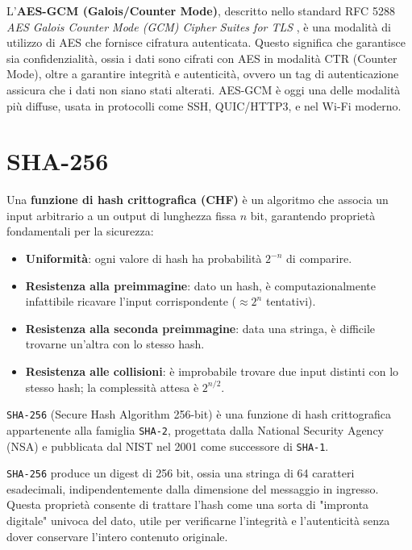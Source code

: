 L’\textbf{AES-GCM (Galois/Counter Mode)}, descritto nello standard RFC 5288 \textit{AES Galois Counter Mode
(GCM) Cipher Suites for TLS} \cite{rfc5288}, è una modalità di utilizzo di AES che fornisce cifratura autenticata.
Questo significa che garantisce sia confidenzialità, ossia i dati sono cifrati con AES in modalità CTR (Counter Mode), oltre a garantire integrità e autenticità, ovvero un tag di autenticazione assicura che i dati non siano stati alterati.
AES-GCM è oggi una delle modalità più diffuse, usata in protocolli come SSH, QUIC/HTTP3, e nel Wi-Fi moderno.

\section{SHA-256}\label{sec:sha}

Una \textbf{funzione di hash crittografica (CHF)} è un algoritmo che associa un input arbitrario a un output di lunghezza fissa $n$ bit, garantendo proprietà fondamentali per la sicurezza:

\begin{itemize}
    \item \textbf{Uniformità}: ogni valore di hash ha probabilità $2^{-n}$ di comparire.
    \item \textbf{Resistenza alla preimmagine}: dato un hash, è computazionalmente infattibile ricavare l'input corrispondente ($\approx 2^n$ tentativi).
    \item \textbf{Resistenza alla seconda preimmagine}: data una stringa, è difficile trovarne un'altra con lo stesso hash.
    \item \textbf{Resistenza alle collisioni}: è improbabile trovare due input distinti con lo stesso hash; la complessità attesa è $2^{n/2}$.
\end{itemize}

\texttt{SHA-256} (Secure Hash Algorithm 256-bit) \cite{FIPS180-4} è una funzione di hash crittografica appartenente alla famiglia \texttt{SHA-2}, progettata dalla National Security Agency (NSA) e pubblicata dal NIST nel 2001 come successore di \texttt{SHA-1}.

\texttt{SHA-256} produce un digest di 256 bit, ossia una stringa di 64 caratteri esadecimali, indipendentemente dalla dimensione del messaggio in ingresso. Questa proprietà consente di trattare l'hash come una sorta di "impronta digitale" univoca del dato, utile per verificarne l'integrità e l'autenticità senza dover conservare l'intero contenuto originale.


